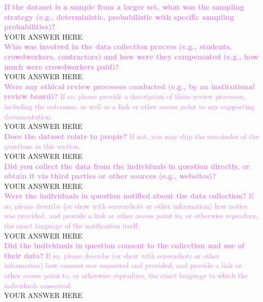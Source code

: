\documentclass[letterpaper, 10 pt, conference]{ieeeconf}
\newcommand{\sectioncolor}{violet}
\begin{document}
    \textcolor{\sectioncolor}{\textbf{
    If the dataset is a sample from a larger set, what was the sampling
    strategy (e.g., deterministic, probabilistic with specific sampling
    probabilities)?
    }
    } \\
    YOUR ANSWER HERE \\
    
    \textcolor{\sectioncolor}{\textbf{
    Who was involved in the data collection process (e.g., students,
    crowdworkers, contractors) and how were they compensated (e.g., how much
    were crowdworkers paid)?
    }
    } \\
    YOUR ANSWER HERE \\
    
    \textcolor{\sectioncolor}{\textbf{
    Were any ethical review processes conducted (e.g., by an institutional
    review board)?
    }
    If so, please provide a description of these review processes, including
    the outcomes, as well as a link or other access point to any supporting
    documentation.
    } \\
    YOUR ANSWER HERE \\
    
    \textcolor{\sectioncolor}{\textbf{
    Does the dataset relate to people?
    }
    If not, you may skip the remainder of the questions in this section.
    } \\
    YOUR ANSWER HERE \\
    
    \textcolor{\sectioncolor}{\textbf{
    Did you collect the data from the individuals in question directly, or
    obtain it via third parties or other sources (e.g., websites)?
    }
    } \\
    YOUR ANSWER HERE \\
    
    \textcolor{\sectioncolor}{\textbf{
    Were the individuals in question notified about the data collection?
    }
    If so, please describe (or show with screenshots or other information) how
    notice was provided, and provide a link or other access point to, or
    otherwise reproduce, the exact language of the notification itself.
    } \\
    YOUR ANSWER HERE \\
    
    \textcolor{\sectioncolor}{\textbf{
    Did the individuals in question consent to the collection and use of their
    data?
    }
    If so, please describe (or show with screenshots or other information) how
    consent was requested and provided, and provide a link or other access
    point to, or otherwise reproduce, the exact language to which the
    individuals consented.
    } \\
    YOUR ANSWER HERE \\
    
\end{document}
